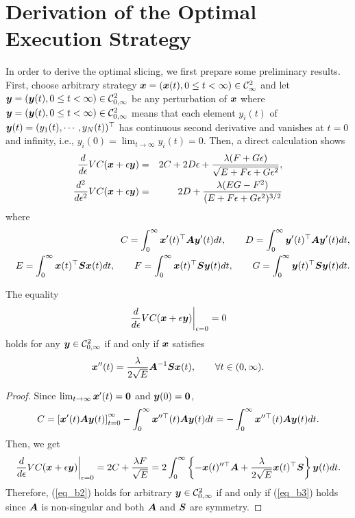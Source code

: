 \section{Derivation of the Optimal Execution Strategy}\label{sec_b3}
 In order to derive the optimal slicing, we first prepare some preliminary results.  First, choose arbitrary strategy $\x = (\x(t), 0\leq t<\infty) \in \calC_\infty^2$ and let $\y=(\y(t), 0\leq t<\infty) \in \calC_{0,\infty}^2$ be any perturbation of $\x$ where $\y=(\y(t), 0\leq t<\infty) \in \calC_{0,\infty}^2$ means that each element $y_i(t)$ of $\y(t)=(y_1(t),\cdots,y_N(t))^\top$ has continuous second derivative and vanishes at $t=0$ and infinity, i.e., $y_i(0) = \lim_{t\rightarrow\infty} y_i(t) = 0$.  Then, a direct calculation shows
\begin{eqnarray*}
  \dif{}{\epsilon} VC(\x + \epsilon \y)
   & = & 2C + 2D\epsilon + \frac{\lambda (F + G \epsilon)}{\sqrt{E + F \epsilon +
         G \epsilon^2}}, \label{eq_b14} \\
  \ddif{}{\epsilon} VC(\x + \epsilon \y)
   & = & 2D + \frac{\lambda (EG-F^2)}{(E+F \epsilon + G \epsilon^2)^{3/2}} \label{eq_b15}
\end{eqnarray*}
where
\begin{eqnarray*}
  & & C = \int_0^\infty \x'(t)^\top \A \y'(t) dt, \qquad D = \int_0^\infty \y'(t)^\top \A \y'(t) dt, \\
  & & E = \int_0^\infty \x(t)^\top \S \x(t) dt, \qquad F = \int_0^\infty \x(t)^\top \S \y(t) dt, \qquad
  G = \int_0^\infty \y(t)^\top \S \y(t) dt.
\end{eqnarray*}
\begin{lemma}\label{lem_b2}
 \quad The equality
\begin{equation}\label{eq_b2}
  \left. \dif{}{\epsilon} VC(\x+\epsilon \y) \right|_{\epsilon=0} = 0
\end{equation}
holds for any $\y \in \calC_{0,\infty}^2$ if and only if $\x$ satisfies
\begin{equation}\label{eq_b3}
  \x''(t) = \frac{\lambda}{2\sqrt{E}} \keymtx \x(t), \qquad \forall t \in (0, \infty).
\end{equation}
\end{lemma}
\begin{proof} Since $\lim_{t\rightarrow\infty} \x'(t)=\0$ and $\y(0)=\0$,
\[
  C = \left[ \x'(t)\A\y(t) \right]_{t=0}^\infty - \int_0^\infty \x''^\top(t) \A \y(t) dt
    = - \int_0^\infty \x''^\top(t) \A \y(t) dt.
\]
 Then, we get
\[
  \left. \dif{}{\epsilon} VC(\x+\epsilon \y) \right|_{\epsilon=0} 
  = 2C + \frac{\lambda F}{\sqrt{E}}
  = 2 \int_0^\infty \left\{ -\x(t)''^\top \A + \frac{\lambda}{2\sqrt{E}}\x(t)^\top \S \right\} \y(t) dt.
\]
 Therefore, (\ref{eq_b2}) holds for arbitrary $\y \in \calC_{0,\infty}^2$ if and only if (\ref{eq_b3}) holds
since $\A$ is non-singular and both $\A$ and $\S$ are symmetry.
\end{proof}

